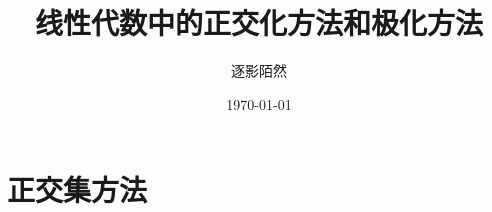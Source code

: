\documentclass[UTF8,10pt, a4paper, oneside,scheme=plain]{ctexbook}
\author{逐影陌然}
\title{\Huge\textbf{线性代数中的正交化方法和极化方法}}
\date{\today}
\begin{document}
	
\frontmatter
\maketitle
	
\tableofcontents
	
\mainmatter
\part{正交集方法}







	
%

\backmatter
\end{document}
